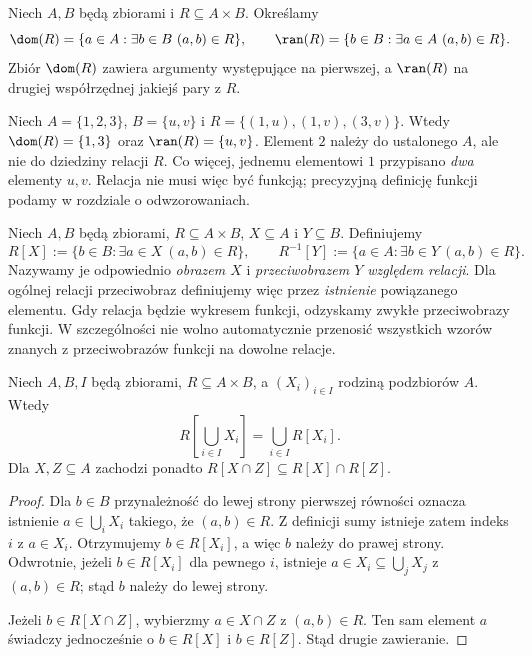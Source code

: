 \begin{definicja}
\label{def:relation-dom-ran}
Niech $A,B$ będą zbiorami i $R\subseteq A\times B$. Określamy
\[
\dom(R)=\{a\in A:\exists b\in B\ (a,b)\in R\},\qquad
\ran(R)=\{b\in B:\exists a\in A\ (a,b)\in R\}.
\]
Zbiór $\dom(R)$ zawiera argumenty występujące na pierwszej,
a $\ran(R)$ na drugiej współrzędnej jakiejś pary z $R$.
\end{definicja}

\begin{przyklad}
Niech $A=\{1,2,3\}$, $B=\{u,v\}$ i
$R=\{(1,u),(1,v),(3,v)\}$.
Wtedy $\dom(R)=\{1,3\}$ oraz $\ran(R)=\{u,v\}$.
Element $2$ należy do ustalonego $A$, ale nie do dziedziny
relacji $R$. Co więcej, jednemu elementowi $1$ przypisano
\emph{dwa} elementy $u,v$. Relacja nie musi więc być funkcją;
precyzyjną definicję funkcji podamy w rozdziale o odwzorowaniach.
\end{przyklad}

\begin{definicja}
\label{def:relation-image}
Niech $A,B$ będą zbiorami, $R\subseteq A\times B$,
$X\subseteq A$ i $Y\subseteq B$. Definiujemy
\[
R[X]:=\{b\in B:\exists a\in X\ (a,b)\in R\},\qquad
R^{-1}[Y]:=\{a\in A:\exists b\in Y\ (a,b)\in R\}.
\]
Nazywamy je odpowiednio \emph{obrazem $X$} i
\emph{przeciwobrazem $Y$ względem relacji}.
Dla ogólnej relacji przeciwobraz definiujemy więc przez
\emph{istnienie} powiązanego elementu. Gdy relacja będzie wykresem
funkcji, odzyskamy zwykłe przeciwobrazy funkcji. W szczególności
nie wolno automatycznie przenosić wszystkich wzorów znanych
z przeciwobrazów funkcji na dowolne relacje.
\end{definicja}

\begin{twierdzenie}
\label{thm:relation-image-unions}
Niech $A,B,I$ będą zbiorami, $R\subseteq A\times B$,
a $(X_i)_{i\in I}$ rodziną podzbiorów $A$. Wtedy
\[
R\left[\bigcup_{i\in I}X_i\right]
=\bigcup_{i\in I}R[X_i].
\]
Dla $X,Z\subseteq A$ zachodzi ponadto
$R[X\cap Z]\subseteq R[X]\cap R[Z]$.
\end{twierdzenie}
\begin{proof}
Dla $b\in B$ przynależność do lewej strony pierwszej
równości oznacza istnienie $a\in\bigcup_i X_i$
takiego, że $(a,b)\in R$. Z definicji sumy istnieje
zatem indeks $i$ z $a\in X_i$. Otrzymujemy $b\in R[X_i]$,
a więc $b$ należy do prawej strony. Odwrotnie,
jeżeli $b\in R[X_i]$ dla pewnego $i$, istnieje
$a\in X_i\subseteq\bigcup_jX_j$ z $(a,b)\in R$;
stąd $b$ należy do lewej strony.

Jeżeli $b\in R[X\cap Z]$, wybierzmy $a\in X\cap Z$
z $(a,b)\in R$. Ten sam element $a$ świadczy jednocześnie
o $b\in R[X]$ i $b\in R[Z]$. Stąd drugie zawieranie.
\end{proof}

